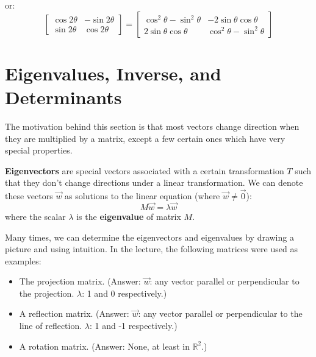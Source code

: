 \documentclass{article}
\let\oldtextbf\textbf
\renewcommand{\textbf}[1]{\oldtextbf{#1}\index{#1}}
\begin{document}
\begin{idea}
\begin{equation}
        \label{eq:}
    \end{equation}
    or:
    \begin{equation}
        \begin{bmatrix}
            \cos2\theta & -\sin2\theta \\ 
            \sin2\theta & \cos2\theta
        \end{bmatrix} = \begin{bmatrix}
            \cos^2\theta-\sin^2\theta & -2\sin\theta\cos\theta \\ 
            2\sin\theta\cos\theta & \cos^2\theta-\sin^2\theta
        \end{bmatrix}
        \label{eq:}
    \end{equation}
\end{idea}
\section{Eigenvalues, Inverse, and Determinants}
The motivation behind this section is that most vectors change direction when they are multiplied by a matrix, except a few certain ones which have very special properties.
\begin{definition}
    \textbf{Eigenvectors} are special vectors associated with a certain transformation $T$ such that they don't change directions under a linear transformation. We can denote these vectors $\vec{w}$ as solutions to the linear equation (where $\vec{w}\neq \vec{0}$):
    \begin{equation}
        M\vec{w}=\lambda\vec{w}
    \end{equation}
    where the scalar $\lambda$ is the \textbf{eigenvalue} of matrix $M$.
\end{definition}
Many times, we can determine the eigenvectors and eigenvalues by drawing a picture and using intuition. In the lecture, the following matrices were used as examples:
\begin{itemize}
    \item The projection matrix. {\small (Answer: $\vec{w}$: any vector parallel or perpendicular to the projection. $\lambda$: 1 and 0 respectively.)}
    \item A reflection matrix. {\small (Answer: $\vec{w}$: any vector parallel or perpendicular to the line of reflection. $\lambda$: 1 and -1 respectively.)}
    \item A rotation matrix. {\small (Answer: None, at least in $\mathbb{R}^2$.)}
\end{itemize}
\end{document}
